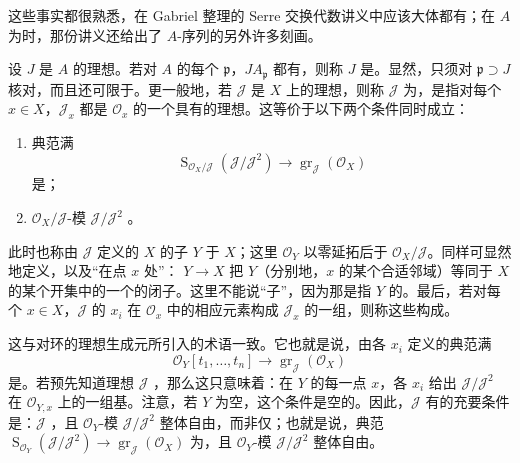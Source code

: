 这些事实都很熟悉，在 Gabriel 整理的 Serre 交换代数讲义中应该大体都有；在 $A$ 为时，那份讲义还给出了 $A$-序列的另外许多刻画。

设 $J$ 是 $A$ 的理想。若对 $A$ 的每个 $\mathfrak p$，$JA_{\mathfrak p}$ 都有，则称 $J$ 是。显然，只须对 $\mathfrak p\supset J$ 核对，而且还可限于。更一般地，若 $\mathcal J$ 是 $X$ 上的理想，则称 $\mathcal J$ 为，是指对每个 $x\in X$，$\mathcal J_x$ 都是 $\mathcal O_x$ 的一个具有的理想。这等价于以下两个条件同时成立：
\begin{enumerate}
\item[(a)] 典范满
\[
\operatorname{S}_{\mathcal O_X/\mathcal J}(\mathcal J/\mathcal J^2)
\longrightarrow\operatorname{gr}_{\mathcal J}(\mathcal O_X)
\]
是；
\item[(b)] $\mathcal O_X/\mathcal J$-模 $\mathcal J/\mathcal J^2$ 。
\end{enumerate}
此时也称由 $\mathcal J$ 定义的 $X$ 的子 $Y$ 于 $X$；这里 $\mathcal O_Y$ 以零延拓后于 $\mathcal O_X/\mathcal J$。同样可显然地定义，以及“在点 $x$ 处”： $Y\to X$ 把 $Y$（分别地，$x$ 的某个合适邻域）等同于 $X$ 的某个开集中的一个的闭子。这里不能说“子”，因为那是指 $Y$ 的。最后，若对每个 $x\in X$，$\mathcal J$ 的 $x_i$ 在 $\mathcal O_x$ 中的相应元素构成 $\mathcal J_x$ 的一组，则称这些构成。

这与对环的理想生成元所引入的术语一致。它也就是说，由各 $x_i$ 定义的典范满
\[
\mathcal O_Y[t_1,\ldots,t_n]\longrightarrow\operatorname{gr}_{\mathcal J}(\mathcal O_X)
\]
是。若预先知道理想 $\mathcal J$ ，那么这只意味着：在 $Y$ 的每一点 $x$，各 $x_i$ 给出 $\mathcal J/\mathcal J^2$ 在 $\mathcal O_{Y,x}$ 上的一组基。注意，若 $Y$ 为空，这个条件是空的。因此，$\mathcal J$ 有的充要条件是：$\mathcal J$ ，且 $\mathcal O_Y$-模 $\mathcal J/\mathcal J^2$ 整体自由，而非仅；也就是说，典范 $\operatorname{S}_{\mathcal O_Y}(\mathcal J/\mathcal J^2)\to\operatorname{gr}_{\mathcal J}(\mathcal O_X)$ 为，且 $\mathcal O_Y$-模 $\mathcal J/\mathcal J^2$ 整体自由。

